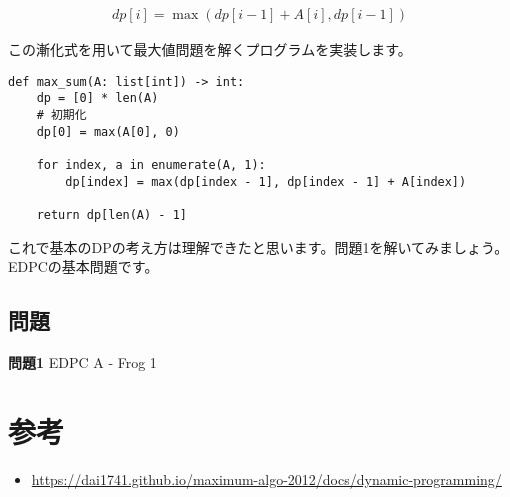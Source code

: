 \documentclass{jlreq}
\begin{document}
\begin{align*}
  dp[i] = \max(dp[i-1] + A[i], dp[i-1])
\end{align*}

この漸化式を用いて最大値問題を解くプログラムを実装します。

\begin{lstlisting}[caption=漸化式を用いた最大値問題の実装, frame=TRBL, label={dp_max}]
def max_sum(A: list[int]) -> int:
    dp = [0] * len(A)
    # 初期化
    dp[0] = max(A[0], 0)
    
    for index, a in enumerate(A, 1):
        dp[index] = max(dp[index - 1], dp[index - 1] + A[index])
    
    return dp[len(A) - 1]
\end{lstlisting}

これで基本のDPの考え方は理解できたと思います。問題1を解いてみましょう。EDPCの基本問題です。

\subsection{問題}
\textbf{問題1} EDPC A - Frog 1\\

\section{参考}
\begin{itemize}
  \item \url{https://dai1741.github.io/maximum-algo-2012/docs/dynamic-programming/}
\end{itemize}
\end{document}
